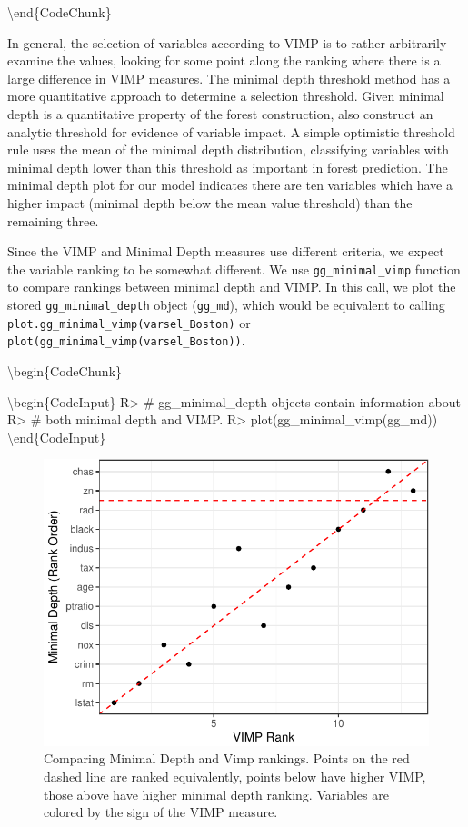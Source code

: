 \documentclass[article]{jss}
\begin{document}
\textbackslash{}end\{CodeChunk\}

In general, the selection of variables according to VIMP is to rather
arbitrarily examine the values, looking for some point along the ranking
where there is a large difference in VIMP measures. The minimal depth
threshold method has a more quantitative approach to determine a
selection threshold. Given minimal depth is a quantitative property of
the forest construction, \citep{Ishwaran:2010} also construct an
analytic threshold for evidence of variable impact. A simple optimistic
threshold rule uses the mean of the minimal depth distribution,
classifying variables with minimal depth lower than this threshold as
important in forest prediction. The minimal depth plot for our model
indicates there are ten variables which have a higher impact (minimal
depth below the mean value threshold) than the remaining three.

Since the VIMP and Minimal Depth measures use different criteria, we
expect the variable ranking to be somewhat different. We use
\texttt{gg\_minimal\_vimp} function to compare rankings between minimal
depth and VIMP. In this call, we plot the stored
\texttt{gg\_minimal\_depth} object (\texttt{gg\_md}), which would be
equivalent to calling \texttt{plot.gg\_minimal\_vimp(varsel\_Boston)} or
\texttt{plot(gg\_minimal\_vimp(varsel\_Boston))}.

\textbackslash{}begin\{CodeChunk\}

\textbackslash{}begin\{CodeInput\} R\textgreater{} \# gg\_minimal\_depth
objects contain information about R\textgreater{} \# both minimal depth
and VIMP. R\textgreater{} plot(gg\_minimal\_vimp(gg\_md))
\textbackslash{}end\{CodeInput\}

\begin{figure}

{\centering \includegraphics{Regression-rfsrc_files/figure-latex/minimalvimp-1} 

}

\caption[Comparing Minimal Depth and Vimp rankings]{Comparing Minimal Depth and Vimp rankings. Points on the red dashed line are ranked equivalently, points below have higher VIMP, those above have higher minimal depth ranking. Variables are colored by the sign of the VIMP measure.}\label{fig:minimalvimp}
\end{figure}
\end{document}

